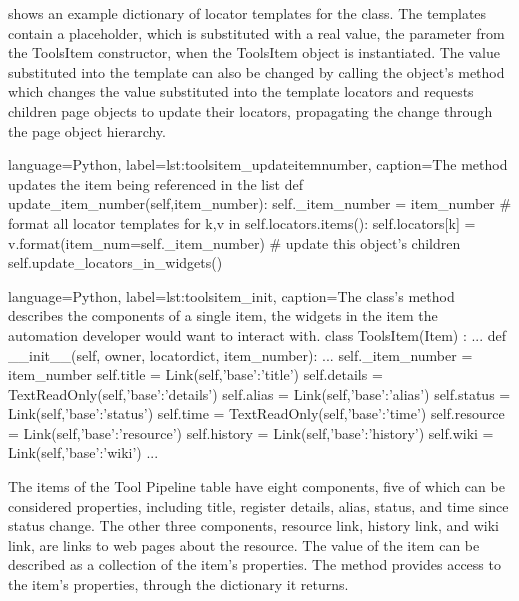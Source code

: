  shows an example dictionary of locator
templates for the  class.  The templates contain a
 placeholder, which is substituted with a real value,
the  parameter from the ToolsItem constructor, when
the ToolsItem object is instantiated.  The value substituted into the template
can also be changed by calling the object's 
method which changes the value substituted into the template locators and
requests children page objects to update their locators, propagating the change
through the page object hierarchy.

\begin{xcode}{%
  language=Python,%
  label=lst:toolsitem_updateitemnumber,%
  caption={The  method updates %
           the item being referenced in the list}%
}
    def update_item_number(self,item_number):
        self._item_number = item_number
        # format all locator templates
        for k,v in self.locators.items():
            self.locators[k] = v.format(item_num=self._item_number)
        # update this object's children
        self.update_locators_in_widgets()
\end{xcode}


\begin{xcode}{%
  language=Python,%
  label=lst:toolsitem_init,%
  caption={The  class's  %
           method describes the components of a single item, the %
           widgets in the item the automation developer would want %
           to interact with.}%
}
class ToolsItem(Item) :
    ...
    def __init__(self, owner, locatordict, item_number):
        ...
        self._item_number  = item_number
        self.title        = Link(self,{'base':'title'})
        self.details      = TextReadOnly(self,{'base':'details'})
        self.alias        = Link(self,{'base':'alias'})
        self.status       = Link(self,{'base':'status'})
        self.time         = TextReadOnly(self,{'base':'time'})
        self.resource     = Link(self,{'base':'resource'})
        self.history      = Link(self,{'base':'history'})
        self.wiki         = Link(self,{'base':'wiki'})
        ...
\end{xcode}

The items of the Tool Pipeline table have eight components, five of which can be
considered properties, including title, register details, alias, status, and
time since status change. The other three components, resource link, history
link, and wiki link, are links to web pages about the resource. The
value of the item can be described as a collection of the item's
properties. The  method provides access to the item's properties,
through the dictionary it returns.

